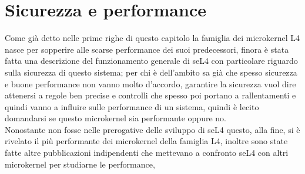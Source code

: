\section{Sicurezza e performance}
Come già detto nelle prime righe di questo capitolo la famiglia dei microkernel L4 nasce per sopperire alle scarse performance dei suoi predecessori, finora è stata fatta una descrizione del funzionamento generale di seL4 con particolare riguardo sulla sicurezza di questo sistema; per chi è dell'ambito sa già che spesso sicurezza e buone performance non vanno molto d'accordo, garantire la sicurezza vuol dire attenersi a regole ben precise e controlli che spesso poi portano a rallentamenti e quindi vanno a influire sulle performance di un sistema, quindi è lecito domandarsi se questo microkernel sia performante oppure no.\\
Nonostante non fosse nelle prerogative delle sviluppo di seL4 questo, alla fine, si è rivelato il più performante dei microkernel della famiglia L4, inoltre sono state fatte altre pubblicazioni indipendenti che mettevano a confronto seL4 con altri microkernel per studiarne le performance, 